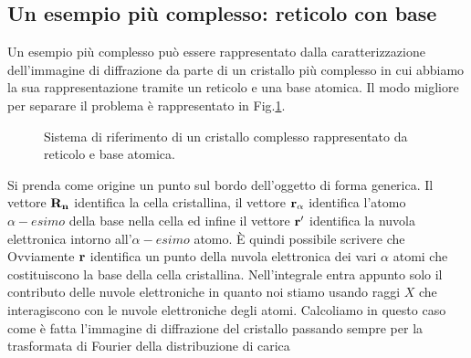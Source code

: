 \documentclass[a4paper,12pt]{article}
\begin{document}
\subsection{Un esempio più complesso: reticolo con base}
Un esempio più complesso può essere rappresentato dalla caratterizzazione dell'immagine di diffrazione da parte di un cristallo più complesso in cui abbiamo la sua rappresentazione tramite un reticolo e una base atomica. Il modo migliore per separare il problema è rappresentato in Fig.\ref{base:laue}.
\begin{figure}
	\centering
	\caption{Sistema di riferimento di un cristallo complesso rappresentato da reticolo e base atomica.}
	\label{base:laue}
\end{figure}
Si prenda come origine un punto sul bordo dell'oggetto di forma generica. Il vettore $\it\bf{R}_n$ identifica la cella cristallina, il vettore $\it\bf{r}_\alpha$ identifica l'atomo $\alpha-esimo$ della base nella cella ed infine il vettore $\it\bf{r'}$ identifica la nuvola elettronica intorno all'$\alpha-esimo$ atomo. \`E  quindi possibile scrivere che
 Ovviamente $\it\bf{r}$ identifica un punto della nuvola elettronica dei vari $\alpha$ atomi che costituiscono la base della cella cristallina. Nell'integrale entra appunto solo il contributo delle nuvole elettroniche in quanto noi stiamo usando raggi $X$ che interagiscono con le nuvole elettroniche degli atomi. Calcoliamo in questo caso come è fatta l'immagine di diffrazione del cristallo passando sempre per la trasformata di Fourier della distribuzione di carica
\end{document}
